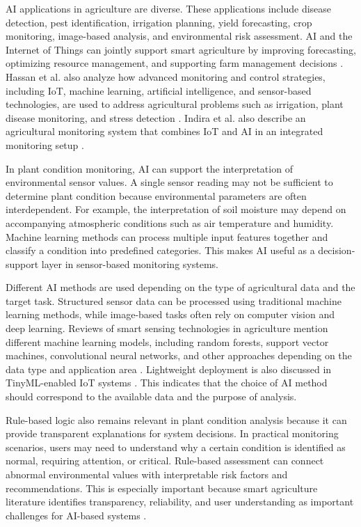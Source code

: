 AI applications in agriculture are diverse. These applications include disease detection, pest identification, irrigation planning, yield forecasting, crop monitoring, image-based analysis, and environmental risk assessment. AI and the Internet of Things can jointly support smart agriculture by improving forecasting, optimizing resource management, and supporting farm management decisions \cite{qazi2022iot}. Hassan et al. also analyze how advanced monitoring and control strategies, including IoT, machine learning, artificial intelligence, and sensor-based technologies, are used to address agricultural problems such as irrigation, plant disease monitoring, and stress detection \cite{hassan2021systematic}. Indira et al. also describe an agricultural monitoring system that combines IoT and AI in an integrated monitoring setup \cite{indira2023fabrication}.

In plant condition monitoring, AI can support the interpretation of environmental sensor values. A single sensor reading may not be sufficient to determine plant condition because environmental parameters are often interdependent. For example, the interpretation of soil moisture may depend on accompanying atmospheric conditions such as air temperature and humidity. Machine learning methods can process multiple input features together and classify a condition into predefined categories. This makes AI useful as a decision-support layer in sensor-based monitoring systems.

Different AI methods are used depending on the type of agricultural data and the target task. Structured sensor data can be processed using traditional machine learning methods, while image-based tasks often rely on computer vision and deep learning. Reviews of smart sensing technologies in agriculture mention different machine learning models, including random forests, support vector machines, convolutional neural networks, and other approaches depending on the data type and application area \cite{miller2025iot}. Lightweight deployment is also discussed in TinyML-enabled IoT systems \cite{helene2025tinyml}. This indicates that the choice of AI method should correspond to the available data and the purpose of analysis.

Rule-based logic also remains relevant in plant condition analysis because it can provide transparent explanations for system decisions. In practical monitoring scenarios, users may need to understand why a certain condition is identified as normal, requiring attention, or critical. Rule-based assessment can connect abnormal environmental values with interpretable risk factors and recommendations. This is especially important because smart agriculture literature identifies transparency, reliability, and user understanding as important challenges for AI-based systems \cite{miller2025iot,nawaz2025iot}.

